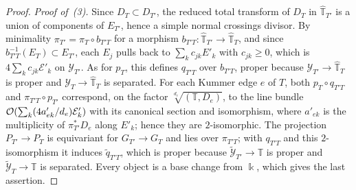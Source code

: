 \begin{proof}
\emph{Proof of~(3).}  Since $D_T\subset D_{T'}$, the reduced
total transform of $D_T$ in $\widehat{\mathbb T}_{T'}$ is a union of components of
$E_{T'}$, hence a simple normal crossings divisor.  By minimality
$\pi_{T'}=\pi_T\circ b_{T'T}$ for a morphism $b_{T'T}:\widehat{\mathbb T}_{T'}\to\widehat{\mathbb T}_T$, and
since $b_{T'T}^{-1}(E_T)\subset E_{T'}$, each $E_j$ pulls back to
$\sum_kc_{jk}E'_k$ with $c_{jk}\geq0$, which is
$4\sum_kc_{jk}\mathcal E'_k$ on $\mathcal Y_{T'}$.  As for $p_T$, this
defines $q_{T'T}$ over $b_{T'T}$, proper because $\mathcal Y_{T'}\to\widehat{\mathbb T}_T$
is proper and $\mathcal Y_T\to\widehat{\mathbb T}_T$ is separated.  For each Kummer edge $e$
of $T$, both $p_T\circ q_{T'T}$ and $\pi_{T'T}\circ p_{T'}$ correspond, on
the factor $\sqrt[d_e]{(\mathbb T,D_e)}$, to the line bundle
$\mathcal O(\sum_k(4a'_{ek}/d_e)\mathcal E'_k)$ with its canonical
section and isomorphism, where $a'_{ek}$ is the multiplicity of
$\pi_{T'}^*D_e$ along $E'_k$; hence they are $2$-isomorphic.  The
projection $P_{T'}\to P_T$ is equivariant for $G_{T'}\to G_T$ and lies over
$\pi_{T'T}$; with $q_{T'T}$ and this $2$-isomorphism it induces
$\widetilde q_{T'T}$, which is proper because
$\widetilde{\mathcal Y}_{T'}\to\mathbb T$ is proper and
$\widetilde{\mathcal Y}_T\to\mathbb T$ is separated.  Every object is a base
change from $\Bbbk$, which gives the last assertion.
\end{proof}
